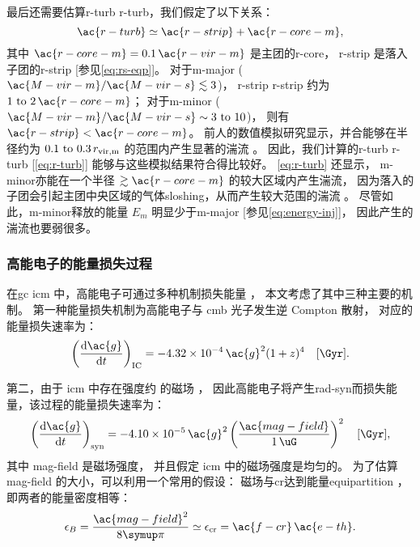 最后还需要估算\acl{r-turb} \ac{r-turb}，我们假定了以下关系：
\begin{equation}
  \label{eq:r-turb}
  \ac{r-turb} \simeq \ac{r-strip} + \ac{r-core-m} ,
\end{equation}
其中
$\ac{r-core-m} = 0.1 \,\ac{r-vir-m}$ 是主团的\acl{r-core}，
\ac{r-strip} 是落入子团的\acl{r-strip} [参见\autoref{eq:rs-eqp}]。
对于\ac{m-major} ($\ac{M-vir-m} / \ac{M-vir-s} \lesssim 3$)，
\acl{r-strip} \ac{r-strip} 约为 $\numrange{1}{2} \,\ac{r-core-m}$；
对于\ac{m-minor} ($\ac{M-vir-m} / \ac{M-vir-s} \sim \numrange{3}{10}$)，
则有 $\ac{r-strip} < \ac{r-core-m}$。
前人的数值模拟研究显示，并合能够在半径约为 $\numrange{0.1}{0.3} \,r_{\R{vir,m}}$
的范围内产生显著的湍流 \cite{vazza2011,vazza2012,miniati2015ss}。
因此，我们计算的\acl{r-turb} \ac{r-turb} [\autoref{eq:r-turb}]
能够与这些模拟结果符合得比较好。
\autoref{eq:r-turb} 还显示，
\ac{m-minor}亦能在一个半径 $\gtrsim \ac{r-core-m}$ 的较大区域内产生湍流，
因为落入的子团会引起主团中央区域的气体\ac{sloshing}，从而产生较大范围的湍流
\cite{vazza2012}。
尽管如此，\ac{m-minor}释放的能量 $E_m$ 明显少于\ac{m-major}
[参见\autoref{eq:energy-inj}]，
因此产生的湍流也要弱很多。

\subsubsection{高能电子的能量损失过程}

在\ac{gc} \ac{icm} 中，高能电子可通过多种机制损失能量 \cite{sarazin1999}，
本文考虑了其中三种主要的机制。
第一种能量损失机制为高能电子与 \ac{cmb} 光子发生逆 Compton 散射，
对应的能量损失速率为：
\begin{equation}
  \label{eq:eloss-ic}
  \left( \diff{\ac{g}}{t} \right)_{\R{IC}} =
    \num{-4.32e-4} \,\ac{g}^2 (1+z)^4
    \quad [\si{\per\Gyr}] .
\end{equation}

第二，由于 \ac{icm} 中存在强度约 \si{\uG} 的磁场 \cite{govoni2004,ryu2008}，
因此高能电子将产生\ac{rad-syn}而损失能量，该过程的能量损失速率为：
\begin{equation}
  \label{eq:eloss-syn}
  \left( \diff{\ac{g}}{t} \right)_{\R{syn}} =
    \num{-4.10e-5} \,\ac{g}^2
    \left( \frac{\ac{mag-field}}{\SI{1}{\uG}} \right)^2
    \quad [\si{\per\Gyr}] ,
\end{equation}
其中 \ac{mag-field} 是磁场强度，
并且假定 \ac{icm} 中的磁场强度是均匀的。
为了估算 \ac{mag-field} 的大小，可以利用一个常用的假设：
磁场与\ac{cr}达到能量\ac{equipartition} \cite{beck2005}，
即两者的能量密度相等：
\begin{equation}
  \epsilon_B = \frac{\ac{mag-field}^2}{8\Cpi}
    \simeq \epsilon_{\R{cr}} = \ac{f-cr}\,\ac{e-th} .
\end{equation}

